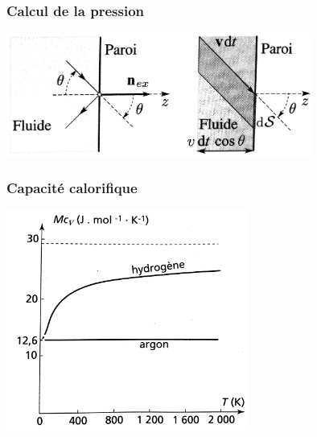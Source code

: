 \documentclass{beamer}
\begin{document}
\begin{frame}
\frametitle{Calcul de la pression}
\centering \includegraphics[width=10cm]{calcP}
\end{frame}



\begin{frame}
\frametitle{Capacité calorifique}
\centerline{\includegraphics[width=8cm]{Cv}}
\end{frame}
\end{document}
